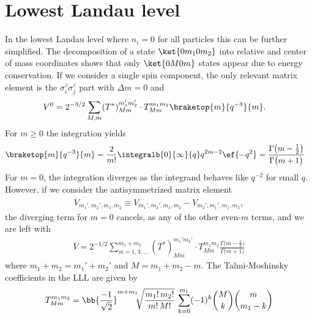 \section{Lowest Landau level}
In the lowest Landau level where $n_i=0$ for all particles this can be further simplified. The decomposition of a state $\ket{0m_10m_2}$ into relative and center of mass coordinates shows that only $\ket{0M0m}$ states appear due to energy conservation. If we consider a single spin component, the only relevant matrix element is the $\sigma^z_i \sigma^z_j$ part with $\Delta m=0$ and
\begin{align*}
V^0 &= 2^{-3/2} \sum_{M,m}  (T^*)^{m_1'm_2'}_{Mm} \cdot T^{m_1m_2}_{Mm} \braketop{m}{q^{-3}}{m}.
\end{align*}
For $m\ge 0$ the integration yields
\begin{align*}
\braketop{m}{q^{-3}}{m} &= \frac{2}{m!} \integralb{0}{\infty}{q} q^{2m-2} \ef{-q^2}
= \frac{\Gamma\big(m-\frac{1}{2}\big)}{\Gamma\big(m+1\big)}
\end{align*}
For $m=0$, the integration diverges as the integrand behaves like $q^{-2}$ for small $q$. However, if we consider the antisymmetrized matrix element
\begin{align*}
\overline{V}_{m_1',m_2',m_1,m_2} \equiv V_{m_1',m_2',m_1,m_2} - V_{m_2',m_1',m_1,m_2},
\end{align*}
the diverging term for $m=0$ cancels, as any of the other even-$m$ terms, and we are left with
\begin{align*}
\overline{V} = 2^{-1/2} \!\! \sum_{m = 1,3,\dots}^{m_1+m_2} \!\! (T^*)^{m_1'm_2'}_{Mm} \cdot T^{m_1m_2}_{Mm} \frac{\Gamma\big(m-\frac{1}{2}\big)}{\Gamma\big(m+1\big)}
\end{align*}
where $m_1+m_2 = m_1'+m_2'$ and  $M=m_1+m_2-m$. The Talmi-Moshinsky coefficients in the LLL are given by
\begin{align*}
T^{m_1m_2}_{Mm} = \bb{\frac{-1}{\sqrt{2}}}^{m+m_1} \!\! \sqrt{\frac{m_1!\,m_2!}{m!\, M!}} \,\sum_{k=0}^{m_1} (-1)^k \binom{M}{k} \binom{m}{m_1-k}
\end{align*}
